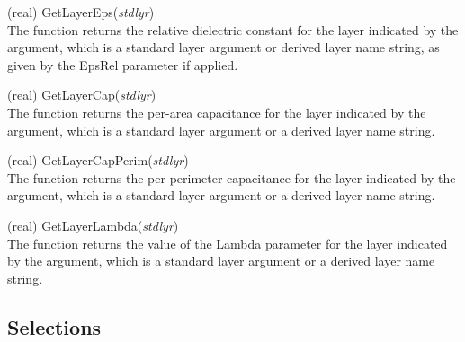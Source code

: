 \begin{description}
\item{(real) \vt GetLayerEps({\it stdlyr\/})}\\
The function returns the relative dielectric constant for the layer
indicated by the argument, which is a standard layer argument or
derived layer name string, as given by the {\et EpsRel} parameter if
applied.

\item{(real) \vt GetLayerCap({\it stdlyr\/})}\\
The function returns the per-area capacitance for the layer indicated
by the argument, which is a standard layer argument or a derived layer
name string.

\item{(real) \vt GetLayerCapPerim({\it stdlyr\/})}\\
The function returns the per-perimeter capacitance for the layer
indicated by the argument, which is a standard layer argument or a
derived layer name string.

\item{(real) \vt GetLayerLambda({\it stdlyr\/})}\\
The function returns the value of the {\et Lambda} parameter for the
layer indicated by the argument, which is a standard layer argument or
a derived layer name string.

\end{description}


\subsection{Selections}

